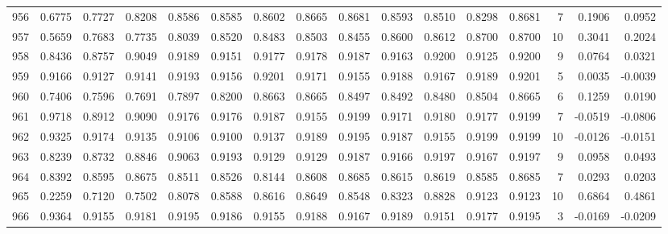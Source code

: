 \begin{tabular}{lrrrrrrrrrrrrrrr}
956 &      0.6775 &  0.7727 &  0.8208 &  0.8586 &  0.8585 &  0.8602 &  0.8665 &  0.8681 &  0.8593 &  0.8510 &   0.8298 &     0.8681 &      7 &                    0.1906 &                     0.0952 \\
957 &      0.5659 &  0.7683 &  0.7735 &  0.8039 &  0.8520 &  0.8483 &  0.8503 &  0.8455 &  0.8600 &  0.8612 &   0.8700 &     0.8700 &     10 &                    0.3041 &                     0.2024 \\
958 &      0.8436 &  0.8757 &  0.9049 &  0.9189 &  0.9151 &  0.9177 &  0.9178 &  0.9187 &  0.9163 &  0.9200 &   0.9125 &     0.9200 &      9 &                    0.0764 &                     0.0321 \\
959 &      0.9166 &  0.9127 &  0.9141 &  0.9193 &  0.9156 &  0.9201 &  0.9171 &  0.9155 &  0.9188 &  0.9167 &   0.9189 &     0.9201 &      5 &                    0.0035 &                    -0.0039 \\
960 &      0.7406 &  0.7596 &  0.7691 &  0.7897 &  0.8200 &  0.8663 &  0.8665 &  0.8497 &  0.8492 &  0.8480 &   0.8504 &     0.8665 &      6 &                    0.1259 &                     0.0190 \\
961 &      0.9718 &  0.8912 &  0.9090 &  0.9176 &  0.9176 &  0.9187 &  0.9155 &  0.9199 &  0.9171 &  0.9180 &   0.9177 &     0.9199 &      7 &                   -0.0519 &                    -0.0806 \\
962 &      0.9325 &  0.9174 &  0.9135 &  0.9106 &  0.9100 &  0.9137 &  0.9189 &  0.9195 &  0.9187 &  0.9155 &   0.9199 &     0.9199 &     10 &                   -0.0126 &                    -0.0151 \\
963 &      0.8239 &  0.8732 &  0.8846 &  0.9063 &  0.9193 &  0.9129 &  0.9129 &  0.9187 &  0.9166 &  0.9197 &   0.9167 &     0.9197 &      9 &                    0.0958 &                     0.0493 \\
964 &      0.8392 &  0.8595 &  0.8675 &  0.8511 &  0.8526 &  0.8144 &  0.8608 &  0.8685 &  0.8615 &  0.8619 &   0.8585 &     0.8685 &      7 &                    0.0293 &                     0.0203 \\
965 &      0.2259 &  0.7120 &  0.7502 &  0.8078 &  0.8588 &  0.8616 &  0.8649 &  0.8548 &  0.8323 &  0.8828 &   0.9123 &     0.9123 &     10 &                    0.6864 &                     0.4861 \\
966 &      0.9364 &  0.9155 &  0.9181 &  0.9195 &  0.9186 &  0.9155 &  0.9188 &  0.9167 &  0.9189 &  0.9151 &   0.9177 &     0.9195 &      3 &                   -0.0169 &                    -0.0209 \\

\end{tabular}
